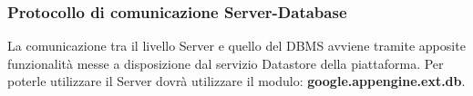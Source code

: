 		\subsubsection{Protocollo di comunicazione Server-Database}
		La comunicazione tra il livello Server e quello del DBMS avviene tramite apposite funzionalità messe a disposizione dal servizio Datastore della piattaforma. Per poterle utilizzare il Server dovrà utilizzare il modulo: \textbf{google.appengine.ext.db}.


